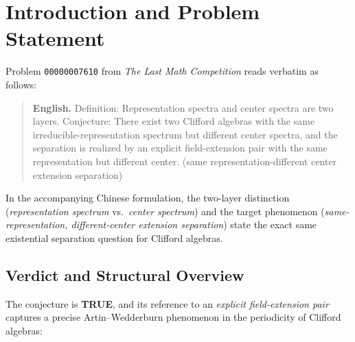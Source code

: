 \documentclass[11pt,a4paper]{article}
\theoremstyle{plain}
\theoremstyle{definition}
\begin{document}
\section{Introduction and Problem Statement}

Problem \texttt{00000007610} from \emph{The Last Math Competition} reads verbatim as follows:

\begin{quote}
\textbf{English.} Definition: Representation spectra and center spectra are two layers. Conjecture: There exist two Clifford algebras with the same irreducible-representation spectrum but different center spectra, and the separation is realized by an explicit field-extension pair with the same representation but different center. (same representation-different center extension separation)
\end{quote}

In the accompanying Chinese formulation, the two-layer distinction (\emph{representation spectrum} vs.\ \emph{center spectrum}) and the target phenomenon (\emph{same-representation, different-center extension separation}) state the exact same existential separation question for Clifford algebras.

\subsection{Verdict and Structural Overview}

The conjecture is \textbf{TRUE}, and its reference to an \emph{explicit field-extension pair} captures a precise Artin--Wedderburn phenomenon in the periodicity of Clifford algebras:
\end{document}
